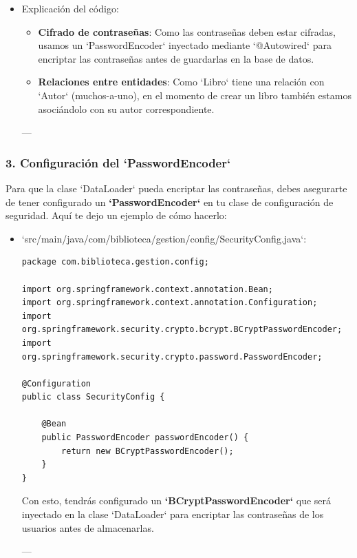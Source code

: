 \documentclass[11pt]{article}
\begin{document}
\begin{itemize}
\item Explicación del código:
\label{sec:org9e6504d}
\begin{itemize}
\item \textbf{\textbf{Cifrado de contraseñas}}: Como las contraseñas deben estar cifradas, usamos un `PasswordEncoder` inyectado mediante `@Autowired` para encriptar las contraseñas antes de guardarlas en la base de datos.
\item \textbf{\textbf{Relaciones entre entidades}}: Como `Libro` tiene una relación con `Autor` (muchos-a-uno), en el momento de crear un libro también estamos asociándolo con su autor correspondiente.
\end{itemize}

---
\end{itemize}

\subsubsection{3. Configuración del `PasswordEncoder`}
\label{sec:org308e978}

Para que la clase `DataLoader` pueda encriptar las contraseñas, debes asegurarte de tener configurado un \textbf{\textbf{`PasswordEncoder`}} en tu clase de configuración de seguridad. Aquí te dejo un ejemplo de cómo hacerlo:

\begin{itemize}
\item `src/main/java/com/biblioteca/gestion/config/SecurityConfig.java`:
\label{sec:org71d16a3}

\begin{verbatim}
package com.biblioteca.gestion.config;

import org.springframework.context.annotation.Bean;
import org.springframework.context.annotation.Configuration;
import org.springframework.security.crypto.bcrypt.BCryptPasswordEncoder;
import org.springframework.security.crypto.password.PasswordEncoder;

@Configuration
public class SecurityConfig {

    @Bean
    public PasswordEncoder passwordEncoder() {
        return new BCryptPasswordEncoder();
    }
}
\end{verbatim}

Con esto, tendrás configurado un \textbf{\textbf{`BCryptPasswordEncoder`}} que será inyectado en la clase `DataLoader` para encriptar las contraseñas de los usuarios antes de almacenarlas.

---
\end{itemize}
\end{document}
